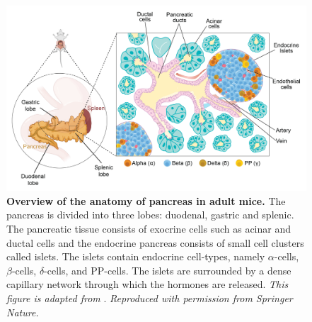 \begin{figure}[t]
\centering
\includegraphics[width=\linewidth]{Chapter1/Fig/F1-1-01.png}
\caption[Morphology of mouse pancreatic tissue]{\textbf{Overview of the anatomy of pancreas in adult mice.} The pancreas is divided into three lobes: duodenal, gastric and splenic. The pancreatic tissue consists of exocrine cells such as acinar and ductal cells and the endocrine pancreas consists of small cell clusters called islets. The islets contain endocrine cell-types, namely $\alpha$-cells, $\beta$-cells, $\delta$-cells, and PP-cells. The islets are surrounded by a dense capillary network through which the hormones are released. \textit{This figure is adapted from }\textbf{\cite{shih_pancreas_2013,jain_targeting_2022}}.\textit{ Reproduced with permission from Springer Nature.}}
\label{fig1-1}
\end{figure}



